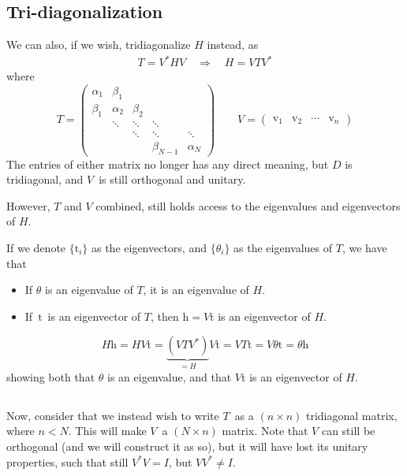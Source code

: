 \documentclass[12p,a4paper]{article}
\renewcommand{\b}[1]{\boldsymbol{\mathrm{#1}}}
\begin{document}
\subsection{Tri-diagonalization}
We can also, if we wish, tridiagonalize $H$ instead, as
\begin{align}
    T = V^*HV \quad\Rightarrow\quad H = V T V^*
\end{align}
where
\[
    T = \begin{pmatrix} \alpha_1 & \beta_1           &       &   & \\
                         \beta_1 & \alpha_2 &  \beta_2  &  &\\
                               & \ddots  &  \ddots & \ddots  &  \\
                               &   &  \ddots & \ddots  & \ddots \\
                               &   &           &  \beta_{N-1} & \alpha_N
        \end{pmatrix}
        \quad\quad
    V = \begin{pmatrix} \b v_1 & \b v_2 & \cdots & \b v_n \end{pmatrix}
\]
The entries of either matrix no longer has any direct meaning, but $D$ is tridiagonal, and $V$ is still orthogonal and unitary.

However, $T$ and $V$ combined, still holds access to the eigenvalues and eigenvectors of $H$.

If we denote $\{ \b t_i \}$ as the eigenvectors, and $\{\theta_i \}$ as the eigenvalues of $T$, we have that
\begin{itemize}
    \item If $\theta$ is an eigenvalue of $T$, it is an eigenvalue of $H$.
    \item If $\b t$ is an eigenvector of $T$, then $\b h = V\b t$ is an eigenvector of $H$.
\end{itemize}
\[
    H\b h = HV\b t = \underbrace{(VTV^*)}_{=H}V\b t = VT\b t = V \theta \b t = \theta \b h
\]
showing both that $\theta$ is an eigenvalue, and that $V\b t$ is an eigenvector of $H$.

\subsection{}
Now, consider that we instead wish to write $T$ as a $(n\times n)$ tridiagonal matrix, where $n < N$. This will make $V$ a $(N\times n)$ matrix. Note that $V$ can still be orthogonal (and we will construct it as so), but it will have lost its unitary properties, such that still $V^*V = I$, but $VV^* \neq I$.
\end{document}
